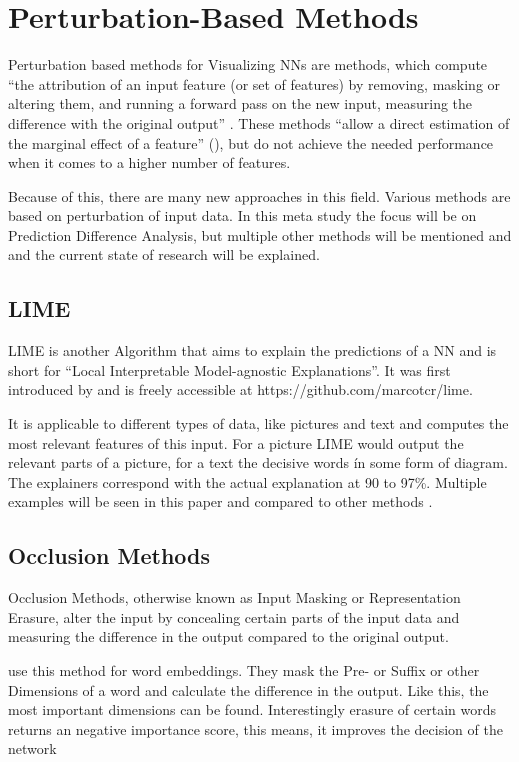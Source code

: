\section{Perturbation-Based Methods}
Perturbation based methods for Visualizing NNs are methods, which compute “the attribution of an input feature (or set of features) by removing, masking or altering them, and running a forward pass on the new input, measuring the difference with the original output” \cite[p.2]{Acona.2018}.
These methods “allow a direct estimation of the marginal effect of a feature” (\cite[p.2]{Acona.2018}), but do not achieve the needed performance when it comes to a higher number of features.
\par
Because of this, there are many new approaches in this field.
Various methods are based on perturbation of input data. In this meta study the focus will be on Prediction Difference Analysis, but multiple other methods will be mentioned and and the current state of research will be explained.


\subsection{LIME}
LIME is another Algorithm that aims to explain the predictions of a NN and is short for “Local Interpretable Model-agnostic Explanations”. It was first introduced by  and is freely accessible at https://github.com/marcotcr/lime.
\par
It is applicable to different types of data, like pictures and text and computes the most relevant features of this input. For a picture LIME would output the relevant parts of a picture, for a text the decisive words ín some form of diagram. The explainers correspond with the actual explanation at 90 to 97\%. Multiple examples will be seen in this paper and compared to other methods \cite{Ribeiro.2016}.

\subsection{Occlusion Methods}
Occlusion Methods, otherwise known as Input Masking or Representation Erasure, alter the input by concealing certain parts of the input data and measuring the difference in the output compared to the original output. 
\par
{} use this method for word embeddings. They mask the Pre- or Suffix or other Dimensions of a word and calculate the difference in the output. Like this, the most important dimensions can be found. Interestingly erasure of certain words returns an negative importance score, this means, it improves the decision of the network

